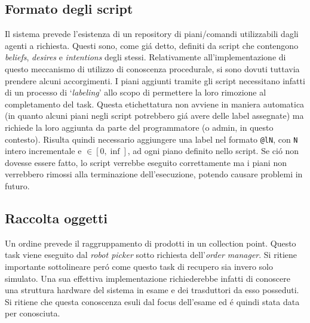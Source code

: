 \subsection{Formato degli script}
Il sistema prevede l'esistenza di un repository di piani/comandi utilizzabili dagli agenti a richiesta. Questi sono, come gi\'a detto, definiti da script che contengono \textit{beliefs}, \textit{desires} e \textit{intentions} degli stessi. Relativamente all'implementazione di questo meccanismo di utilizzo di conoscenza procedurale, si sono dovuti tuttavia prendere alcuni accorgimenti. I piani aggiunti tramite gli script necessitano infatti di un processo di `\textit{labeling}' allo scopo di permettere la loro rimozione al completamento del task. Questa etichettatura non avviene in maniera automatica (in quanto alcuni piani negli script potrebbero gi\'a avere delle label assegnate) ma richiede la loro aggiunta da parte del programmatore (o admin, in questo contesto). Risulta quindi necessario aggiungere una label nel formato \texttt{@lN}, con \texttt{N} intero incrementale e $\in [0, \inf]$, ad ogni piano definito nello script. Se ci\'o non dovesse essere fatto, lo script verrebbe eseguito correttamente ma i piani non verrebbero rimossi alla terminazione dell'esecuzione, potendo causare problemi in futuro. 

\subsection{Raccolta oggetti}
Un ordine prevede il raggruppamento di prodotti in un collection point. Questo task viene eseguito dal \textit{robot picker} sotto richiesta dell'\textit{order manager}. Si ritiene importante sottolineare per\'o come questo task di recupero sia invero solo simulato. Una sua effettiva implementazione richiederebbe infatti di conoscere una struttura hardware del sistema in esame e dei trasduttori da esso posseduti. Si ritiene che questa conoscenza esuli dal focus dell'esame ed \'e quindi stata data per conosciuta.
